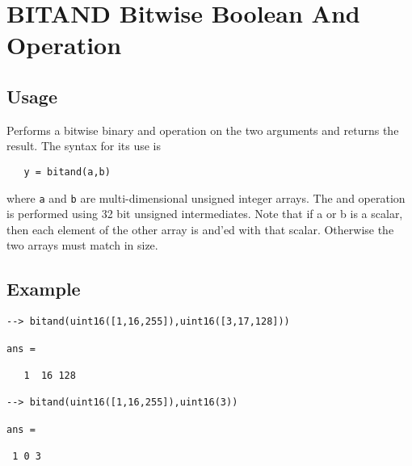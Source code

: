 \section{BITAND Bitwise Boolean And Operation}

\subsection{Usage}

Performs a bitwise binary and operation on the two arguments and
returns the result.  The syntax for its use is
\begin{verbatim}
   y = bitand(a,b)
\end{verbatim}
where \verb|a| and \verb|b| are multi-dimensional unsigned integer arrays.
The and operation is performed using 32 bit unsigned intermediates.  Note that if a
or b is a scalar, then each element of the other array is and'ed with
 that scalar.  Otherwise the two arrays must match in size.
\subsection{Example}

\begin{verbatim}
--> bitand(uint16([1,16,255]),uint16([3,17,128]))

ans = 

   1  16 128 

--> bitand(uint16([1,16,255]),uint16(3))

ans = 

 1 0 3 
\end{verbatim}
